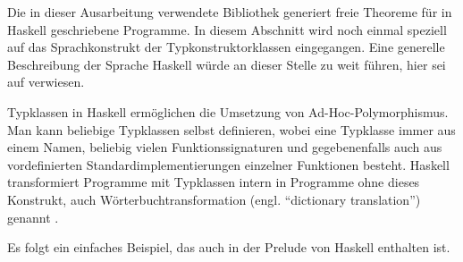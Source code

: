 Die in dieser Ausarbeitung verwendete Bibliothek generiert freie Theoreme für in Haskell geschriebene Programme. In diesem Abschnitt wird noch einmal speziell auf das Sprachkonstrukt der Typkonstruktorklassen eingegangen.
Eine generelle Beschreibung der Sprache Haskell würde an dieser Stelle zu weit führen, hier sei auf \cite{haskell} verwiesen.







Typklassen in Haskell ermöglichen die Umsetzung von Ad-Hoc-Polymorphismus. Man kann beliebige Typklassen selbst definieren,
wobei eine Typklasse immer aus einem Namen, beliebig vielen Funktionssignaturen und gegebenenfalls auch aus vordefinierten
Standardimplementierungen einzelner Funktionen besteht. Haskell transformiert Programme mit Typklassen intern in Programme
ohne dieses Konstrukt, auch Wörterbuchtransformation (engl. ``dictionary translation'') genannt \cite{jones}.

Es folgt ein einfaches Beispiel, das auch in der Prelude von Haskell enthalten ist.


